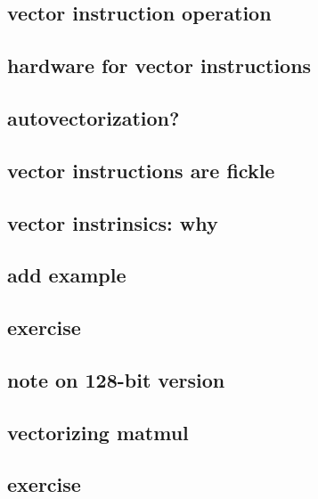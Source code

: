 \subsection{vector instruction operation}


\subsection{hardware for vector instructions}


\subsection{autovectorization?}


\subsection{vector instructions are fickle}


\subsection{vector instrinsics: why}


\subsection{add example}



\subsection{exercise}


\subsection{note on 128-bit version}


\subsection{vectorizing matmul}


\subsection{exercise}


